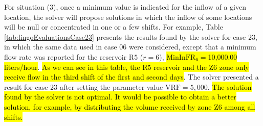 \documentclass{singlecol}
\theoremstyle{TH}{
\newtheorem{lemma}{Lemma}
\newtheorem{theorem}[lemma]{Theorem}
\newtheorem{corrolary}[lemma]{Corrolary}
\newtheorem{conjecture}[lemma]{Conjecture}
\newtheorem{proposition}[lemma]{Proposition}
\newtheorem{claim}[lemma]{Claim}
\newtheorem{stheorem}[lemma]{Wrong Theorem}
\newtheorem{algorithm}{Algorithm}
}
\theoremstyle{THrm}{
\newtheorem{definition}{Definition}[section]
\newtheorem{question}{Question}[section]
\newtheorem{remark}{Remark}
\newtheorem{scheme}{Scheme}
}
\theoremstyle{THhit}{
\newtheorem{case}{Case}[section]
}
\begin{document}
For situation (3), once a minimum value is indicated for the inflow of a given location, the solver will propose solutions in which the inflow of some locations will be null or concentrated in one or a few shifts. For example, Table \ref{tab:lingoEvaluationsCase23} presents the results found by the solver for case 23, in which the same data used in case 06 were considered, except that a minimum flow rate was reported for the reservoir $\mathrm{R5}$ ($r=6$), \hl{$\mathrm{MinInFR}_6 = $10,000.00 liters/hour}. \hl{As we can see in this table, the R5 reservoir and the Z6 zone only receive flow in the third shift of the first and second days}. The solver presented a result for case 23 after setting the parameter value $\mathrm{VRF}=5,000$. \hl{The solution found by the solver is not optimal. It would be possible to obtain a better solution, for example, by distributing the volume received by zone Z6 among all shifts.}
\end{document}
